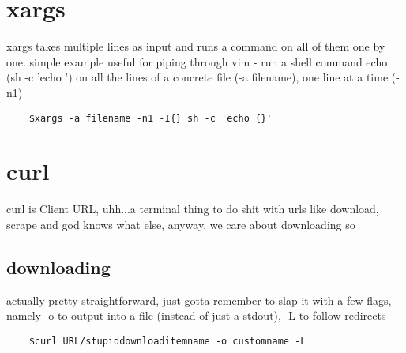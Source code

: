\section{xargs}%
\label{sec:xargs}

xargs takes multiple lines as input and runs a command on all of them one by one. simple example useful for piping through vim - run a shell command echo (sh -c 'echo {}') on all the lines of a concrete file (-a filename), one line at a time (-n1)
\begin{verbatim}
	$xargs -a filename -n1 -I{} sh -c 'echo {}'
\end{verbatim}
\section{curl}%
\label{sec:curl}

curl is Client URL, uhh...a terminal thing to do shit with urls like download, scrape and god knows what else, anyway, we care about downloading so
\subsection{downloading}%
\label{sub:downloading}

actually pretty straightforward, just gotta remember to slap it with a few flags, namely -o to output into a file (instead of just a stdout), -L to follow redirects
\begin{verbatim}
	$curl URL/stupiddownloaditemname -o customname -L
\end{verbatim}
